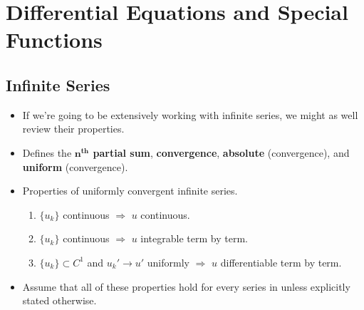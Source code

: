 \documentclass[../finalProject.tex]{subfiles}
\begin{document}
\section{Differential Equations and Special Functions}
\subsection{Infinite Series}
\begin{itemize}
    \item {}If we're going to be extensively working with infinite series, we might as well review their properties.
    \item Defines the \textbf{$\bm{n}^\textbf{th}$ partial sum}, \textbf{convergence}, \textbf{absolute} (convergence), and \textbf{uniform} (convergence).
    \item Properties of uniformly convergent infinite series.
    \begin{enumerate}
        \item $\{u_k\}$ continuous $\Longrightarrow$ $u$ continuous.
        \item $\{u_k\}$ continuous $\Longrightarrow$ $u$ integrable term by term.
        \item $\{u_k\}\subset C^1$ and $u_k'\to u'$ uniformly $\Longrightarrow$ $u$ differentiable term by term.
    \end{enumerate}
    \item Assume that all of these properties hold for every series in \textcite{bib:Seaborn} unless explicitly stated otherwise.
\end{itemize}
\end{document}
